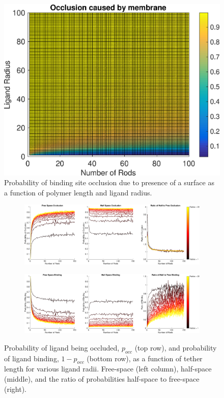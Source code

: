 \documentclass[../../AdvancementSummary.tex]{subfiles}
\begin{document}
\begin{figure}[h]
       \begin{center}
       		\includegraphics[width=0.7\linewidth]{ResultsFigures/MembraneCausedOcclusion/MembraneCausedOcclusionVSNVSirLigand.eps}
       \end{center}
       \caption{Probability of binding site occlusion due to presence of a surface as a function of polymer length and ligand radius. \label{fig: MembraneOcclusionVSNVSR}}
\end{figure}

\begin{figure}[h]
    \begin{center}
        \begin{subfigure}{\linewidth}
        		\includegraphics[width=\linewidth]{ResultsFigures/BindingSurfaceFactor/OcclusionVSN.eps}
        		\caption{}
        \end{subfigure}
        	\begin{subfigure}{\linewidth}
        		\includegraphics[width=\linewidth]{ResultsFigures/BindingSurfaceFactor/BindingVSN.eps}
        		\caption{}
        \end{subfigure}
        \caption{Probability of ligand being occluded, $p_{occ}$ (top row), and probability of ligand binding, $1-p_{occ}$ (bottom row), as a function of tether length for various ligand radii. Free-space (left column), half-space (middle), and the ratio of probabilities half-space to free-space (right). \label{fig: OcclusionVSN} }
       \end{center}
\end{figure}
       
\end{document}
